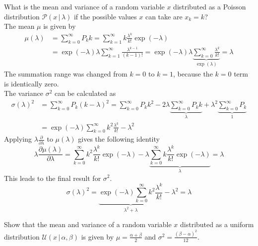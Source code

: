 \documentclass{tstextbook}
\begin{document}
\begin{example}
What is the mean and variance of a random variable $x$ distributed as a Poisson distribution $\mathcal{P}\left(x\,\vert\,\lambda\right)$ if the possible values $x$ can take are $x_k=k$?\\
The mean $\mu$ is given by 
  \begin{equation}
  \begin{aligned}
    \mu(\lambda)&=\sum_{k=0}^{\infty}P_k k=\sum_{k=1}^{\infty}k\frac{\lambda^k}{k!}\exp(-\lambda)\\ &=\exp(-\lambda)\lambda\sum_{k=1}^{\infty}\frac{\lambda^{k-1}}{(k-1)!}=\exp(-\lambda)\lambda\underbrace{\sum_{k=0}^{\infty}\frac{\lambda^{k}}{k!}}_{\exp(\lambda)}=\lambda
  \end{aligned}
  \end{equation}
The summation range was changed from $k=0$ to $k=1$, because the $k=0$ term is identically zero.\\
The variance $\sigma^2$ can be calculated as 
  \begin{equation}
  \begin{aligned}
    \sigma(\lambda)^2&=\sum_{k=0}^{\infty}P_k (k-\lambda)^2=\sum_{k=0}^{\infty}P_k k^2 - 2\lambda \underbrace{\sum_{k=0}^{\infty}P_k k}_{\lambda} + \lambda^2\underbrace{\sum_{k=0}^{\infty}P_k}_{1}\\
&=\exp(-\lambda)\sum_{k=0}^{\infty}k^2\frac{\lambda^k}{k!} - \lambda^2
  \end{aligned}
  \end{equation}
Applying $\lambda\frac{\partial}{\partial \lambda}$ to $\mu(\lambda)$ gives the following identity
\begin{equation}
\lambda\frac{\partial \mu(\lambda)}{\partial \lambda}=\sum_{k=0}^{\infty}k^2\frac{\lambda^k}{k!}\exp(-\lambda)-\lambda\underbrace{\sum_{k=0}^{\infty}k\frac{\lambda^k}{k!}\exp(-\lambda)}_{\lambda}=\lambda
\end{equation}  
This leads to the final result for $\sigma^2$.
  \begin{equation}
    \sigma(\lambda)^2=\underbrace{\exp(-\lambda)\sum_{k=0}^{\infty}k^2\frac{\lambda^k}{k!}}_{\lambda^2+\lambda} - \lambda^2=\lambda
  \end{equation}  
\end{example}

\begin{exercise}
 Show that the mean and variance of a random variable $x$ distributed as a uniform distribution $\mathcal{U}\left(x\,\vert\,\alpha,\beta\right)$ is given by $\mu=\frac{\alpha+\beta}{2}$ and $\sigma^2=\frac{(\beta-\alpha)^2}{12}$.
\end{exercise}
\end{document}
